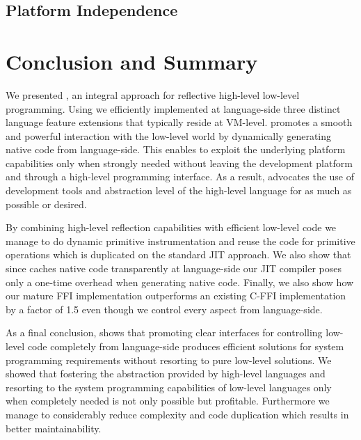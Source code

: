 \subsection{Platform Independence}


\section{Conclusion and Summary}
We presented \B, an integral approach for reflective high-level low-level programming.
Using \B we efficiently implemented at language-side three distinct language feature extensions that typically reside at VM-level.
\B promotes a smooth and powerful interaction with the low-level world by dynamically generating native code from language-side.
This enables to exploit the underlying platform capabilities only when strongly needed without leaving the development platform and through a high-level programming interface. 
As a result, \B advocates the use of development tools and abstraction level of the high-level language for as much as possible or desired.

By combining high-level reflection capabilities with efficient low-level code we manage to do dynamic primitive instrumentation and reuse the code for primitive operations which is duplicated on the standard JIT approach.
We also show that since \B caches native code transparently at language-side our JIT compiler poses only a one-time overhead when generating native code. 
Finally, we also show how our mature FFI implementation outperforms an existing C-FFI implementation by a factor of 1.5 even though we control every aspect from language-side.


As a final conclusion, \B shows that promoting clear interfaces for controlling low-level code completely from language-side produces efficient solutions for system programming requirements without resorting to pure low-level solutions.
We showed that fostering the abstraction provided by high-level languages and resorting to the system programming capabilities of low-level languages only when completely needed is not only possible but profitable.
Furthermore we manage to considerably reduce complexity and code duplication which results in better maintainability.



